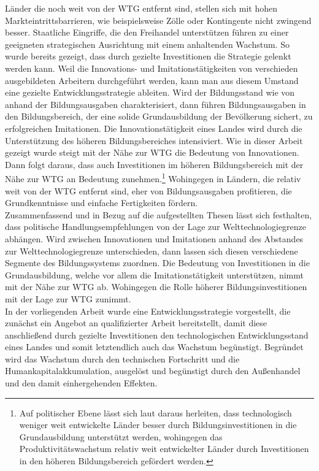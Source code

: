 Länder die noch weit von der WTG entfernt sind, stellen sich mit hohen Markteintrittsbarrieren, wie beispielsweise Zölle oder Kontingente nicht zwingend besser. Staatliche Eingriffe, die den Freihandel unterstützen führen zu einer geeigneten strategischen Ausrichtung mit einem anhaltenden Wachstum. So wurde bereits gezeigt, dass durch gezielte Investitionen die Strategie gelenkt werden kann. Weil die Innovations- und Imitationstätigkeiten von verschieden ausgebildeten Arbeitern durchgeführt werden, kann man aus diesem Umstand eine gezielte Entwicklungsstrategie ableiten. Wird der Bildungsstand wie von \cite{Benhabib.1994} anhand der Bildungsausgaben charakterisiert, dann führen Bildungsausgaben in den Bildungsbereich, der eine solide Grundausbildung der Bevölkerung sichert, zu erfolgreichen Imitationen. Die Innovationstätigkeit eines Landes wird durch die Unterstützung des höheren Bildungsbereiches intensiviert. Wie in dieser Arbeit gezeigt wurde steigt mit der Nähe zur WTG die Bedeutung von Innovationen. Dann folgt daraus, dass auch Investitionen im höheren Bildungsbereich mit der Nähe zur WTG an Bedeutung zunehmen.\footnote{Auf politischer Ebene lässt sich laut \cite{Vandenbussche.2006} daraus herleiten, dass technologisch weniger weit entwickelte Länder besser durch Bildungsinvestitionen in die Grundausbildung unterstützt werden, wohingegen das Produktivitätswachstum relativ weit entwickelter Länder durch Investitionen in den höheren Bildungsbereich gefördert werden.}
Wohingegen in Ländern, die relativ weit von der WTG entfernt sind, eher von Bildungsausgaben profitieren, die Grundkenntnisse und einfache Fertigkeiten fördern.\\
%
Zusammenfassend und in Bezug auf die aufgestellten Thesen lässt sich festhalten, dass politische Handlungsempfehlungen von der Lage zur Welttechnologiegrenze abhängen. Wird zwischen Innovationen und Imitationen anhand des Abstandes zur Welttechnologiegrenze unterschieden, dann lassen sich diesen verschiedene Segmente des Bildungssystems zuordnen. Die Bedeutung von Investitionen in die Grundausbildung, welche vor allem die Imitationstätigkeit unterstützen, nimmt mit der Nähe zur WTG ab. Wohingegen die Rolle höherer Bildungsinvestitionen mit der Lage zur WTG zunimmt.\\
%
In der vorliegenden Arbeit wurde eine Entwicklungsstrategie vorgestellt, die zunächst ein Angebot an qualifizierter Arbeit bereitstellt, damit diese anschließend durch gezielte Investitionen den technologischen Entwicklungsstand eines Landes und somit letztendlich auch das Wachstum begünstigt. Begründet wird das Wachstum durch den technischen Fortschritt und die Humankapitalakkumulation, ausgelöst und begünstigt durch den Außenhandel und den damit einhergehenden Effekten.
